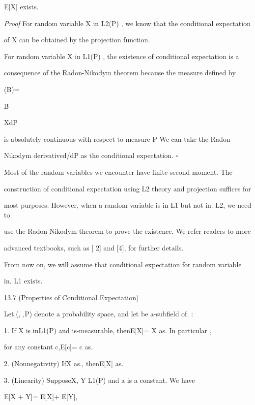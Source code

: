 E[X\vert{}] exists.

\textit{Proof} For random variable X in L2(P) , we know that the conditional expectation

of X can be obtained by the projection function.

For random variable X in L1(P) , the existence of conditional expectation is a

consequence of the Radon-Nikodym theorem because the measure \nu defined by

\nu(B)=

\int

B

XdP

is absolutely continuous with respect to measure P We can take the Radon-

Nikodym derivatived\nu/dP as the conditional expectation. \hfill $\square$

Most of the random variables we encounter have finite second moment. The

construction of conditional expectation using L2 theory and projection suffices for

most purposes. However, when a random variable is in L1 but not in. L2, we need to

use the Radon-Nikodym theorem to prove the existence. We refer readers to more

advanced textbooks, such as [ 2] and [4], for further details.

From now on, we will assume that conditional expectation for random variable

in. L1 exists.

\begin{thmbox}{13.7 (Properties of Conditional Expectation)}
\end{thmbox}

Let.(\Omega, ,P) denote a probability space, and let be a\sigma-subfield of. :

1. If X is inL1(P) and is-measurable, thenE[X\vert{}]= X as. In particular ,

for any constant c,E[c\vert{}]= c as.

2. (Nonnegativity) IfX  as., thenE[X\vert{}] as.

3. (Linearity) SupposeX, Y \in L1(P) and a is a constant. We have

E[X + Y\vert{}]= E[X\vert{}]+ E[Y\vert{}],

